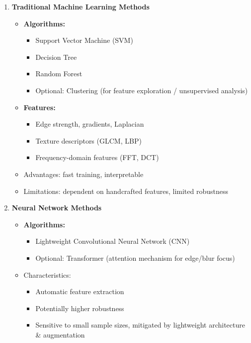 \begin{enumerate}
    \item \textbf{Traditional Machine Learning Methods}
          \begin{itemize}
              \item \textbf{Algorithms:}
                    \begin{itemize}
                        \item Support Vector Machine (SVM)\cite{murphy2022pml}
                        \item Decision Tree\cite{murphy2022pml}
                        \item Random Forest\cite{murphy2022pml}
                        \item Optional: Clustering (for feature exploration / unsupervised analysis)
                    \end{itemize}
              \item \textbf{Features:}
                    \begin{itemize}
                        \item Edge strength, gradients, Laplacian
                        \item Texture descriptors (GLCM, LBP\cite{yi2016lbp})
                        \item Frequency-domain features (FFT, DCT)
                    \end{itemize}
              \item Advantages: fast training, interpretable
              \item Limitations: dependent on handcrafted features, limited robustness
          \end{itemize}

    \item \textbf{Neural Network Methods}
          \begin{itemize}
              \item \textbf{Algorithms:}
                    \begin{itemize}
                        \item Lightweight Convolutional Neural Network (CNN)\cite{zeng2018localmetric}
                        \item Optional: Transformer (attention mechanism for edge/blur focus)
                    \end{itemize}
              \item Characteristics:
                    \begin{itemize}
                        \item Automatic feature extraction
                        \item Potentially higher robustness
                        \item Sensitive to small sample sizes, mitigated by lightweight architecture \&
                              augmentation
                    \end{itemize}
          \end{itemize}


\end{enumerate}
